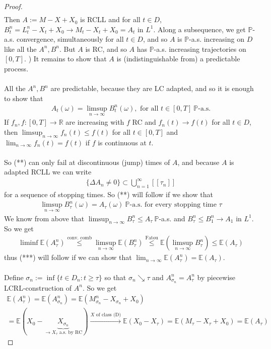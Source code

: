 \documentclass[12pt,a4paper, twoside]{article}
\theoremstyle{definition}
\newcommand{\EE}{\mathbb{E}} %
\newcommand{\PP}{\mathbb{P}} %
\begin{document}
\begin{proof}
\begin{align*}
\end{align*}
Then $A:= M-X+X_0$ is RCLL and for all $t \in D$, $B_t^n = L_t^n-X_t + X_0 \to M_t-X_t + X_0 = A_t$ in $L^1$. Along a subsequence, we get $\PP$-a.s. convergence, simultaneously for all $t \in D$, and so $A$ is $\PP$-a.s. increasing on $D$ like all the $A^n, B^n$. But $A$ is RC, and so $A$ has $\PP$-a.s. increasing trajectories on $[0,T]$. 
\newpage
{}) It remains to show that $A$ is (indistinguishable from) a predictable process. 
\\\\
All the $A^n, B^n$ are predictable, because they are LC adapted, and so it is enough to show that 
\begin{align*}
A_t( \omega) = \limsup_{n \to \infty} B_t^n ( \omega), \text{ for all } t \in [0,T] \ \PP\text{-a.s.} \tag{**}
\end{align*}
If $f_n, f : [0,T] \to \mathbb{R}$ are increasing with $f$ RC and $f_n(t) \to f(t)$ for all $t \in D$, then $\limsup_{n \to \infty} f_n(t) \leq f(t)$ for all $t \in [0,T]$ and $\lim_{n \to \infty} f_n(t) = f(t)$ if $f$ is continuous at $t$. \\
\\
So (**) can only fail at discontinuous (jump) times of $A$, and because $A$ is adapted RCLL we can write 
\begin{align*}
\{ \Delta A_n \neq 0\} \subset \bigcup_{n=1}^\infty [\![ \tau_n ]\!]
\end{align*}
for a sequence of stopping times. So (**) will follow if we show that 
\begin{align*}
\limsup_{n \to \infty} B_\tau^n( \omega) = A_\tau ( \omega) \ \PP\text{-a.s. for every stopping time } \tau \tag{***}
\end{align*}
We know from above that $\limsup_{n \to \infty} B_\tau^n \leq A_\tau \ \PP$-a.s. and $B_\tau^n \leq B_1^n \to A_1$ in $L^1$. So we get 
\begin{align*}
\liminf \EE(A_\tau^n) \overset{\text{conv. comb}}\leq \limsup_{n \to \infty} \EE( B_\tau^n) \overset{\text{Fatou}}\leq \EE( \limsup_{n \to \infty} B_\tau^n) \leq \EE(A_\tau)
\end{align*}
thus (***) will follow if we can show that $\lim_{n \to \infty} \EE( A_\tau^n)= \EE(A_\tau)$. \\
\\
Define $\sigma_n:= \inf \{ t \in D_n : t \geq \tau \}$ so that $\sigma_n \searrow \tau$ and $A_{\sigma_n}^n = A_\tau^n$ by piecewise LCRL-construction of $A^n$. So we  get 
\begin{align*}
\EE(A_\tau^n) = \EE(A_{\sigma_n}^n) = \EE( M_{\sigma_n}^n - X_{\sigma_n} + X_0)  \\
= \EE( X_0 - \underbrace{X_{\sigma_n}}_{ \to X_\tau \text{ a.s. by RC}}) \xrightarrow{X \text{ of class (D)}} \EE(X_0-X_\tau)= \EE(M_\tau-X_\tau + X_0)= \EE( A_\tau) 
\end{align*}
\end{proof}
\end{document}
